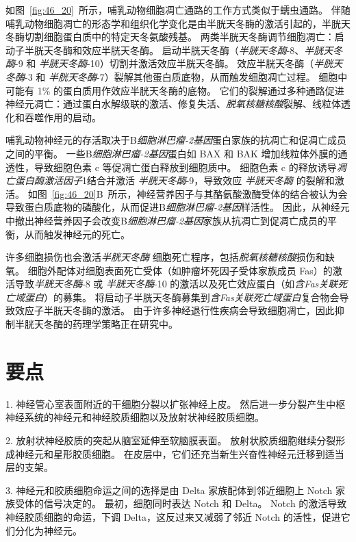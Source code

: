 如图~\ref{fig:46_20}~所示，哺乳动物细胞凋亡通路的工作方式类似于蠕虫通路。
伴随哺乳动物细胞凋亡的形态学和组织化学变化是由半胱天冬酶的激活引起的，半胱天冬酶切割细胞蛋白质中的特定天冬氨酸残基。
两类半胱天冬酶调节细胞凋亡：启动子半胱天冬酶和效应半胱天冬酶。
启动半胱天冬酶（\textit{半胱天冬酶}-8、\textit{半胱天冬酶}-9 和 \textit{半胱天冬酶}-10）切割并激活效应半胱天冬酶。
效应半胱天冬酶（\textit{半胱天冬酶}-3 和 \textit{半胱天冬酶}-7）裂解其他蛋白质底物，从而触发细胞凋亡过程。
细胞中可能有 1\% 的蛋白质用作效应半胱天冬酶的底物。
它们的裂解通过多种通路促进神经元凋亡：通过蛋白水解级联的激活、修复失活、\textit{脱氧核糖核酸}裂解、线粒体透化和吞噬作用的启动。


哺乳动物神经元的存活取决于B\textit{细胞淋巴瘤-}\textit{2基因}蛋白家族的抗凋亡和促凋亡成员之间的平衡。
一些B\textit{细胞淋巴瘤-}\textit{2基因}蛋白如 BAX 和 BAK 增加线粒体外膜的通透性，导致细胞色素 c 等促凋亡蛋白释放到细胞质中。
细胞色素 c 的释放诱导\textit{凋亡蛋白酶激活因子}1结合并激活 \textit{半胱天冬酶}-9，导致效应 \textit{半胱天冬酶} 的裂解和激活。
如图~\ref{fig:46_20}B~所示，神经营养因子与其酪氨酸激酶受体的结合被认为会导致蛋白质底物的磷酸化，从而促进B\textit{细胞淋巴瘤-}\textit{2基因}样活性。
因此，从神经元中撤出神经营养因子会改变B\textit{细胞淋巴瘤-}\textit{2基因}家族从抗凋亡到促凋亡成员的平衡，从而触发神经元的死亡。


许多细胞损伤也会激活\textit{半胱天冬酶} 细胞死亡程序，包括\textit{脱氧核糖核酸}损伤和缺氧。
细胞外配体对细胞表面死亡受体（如肿瘤坏死因子受体家族成员 Fas）的激活导致\textit{半胱天冬酶}-8 或 \textit{半胱天冬酶}-10 的激活以及死亡效应蛋白（如\textit{含Fas关联死亡域蛋白}）的募集。
将启动子半胱天冬酶募集到\textit{含Fas关联死亡域蛋白}复合物会导致效应子半胱天冬酶的激活。
由于许多神经退行性疾病会导致细胞凋亡，因此抑制半胱天冬酶的药理学策略正在研究中。



\section{要点}

1. 神经管心室表面附近的干细胞分裂以扩张神经上皮。
然后进一步分裂产生中枢神经系统的神经元和神经胶质细胞以及放射状神经胶质细胞。


2. 放射状神经胶质的突起从脑室延伸至软脑膜表面。
放射状胶质细胞继续分裂形成神经元和星形胶质细胞。
在皮层中，它们还充当新生兴奋性神经元迁移到适当层的支架。


3. 神经元和胶质细胞命运之间的选择是由 Delta 家族配体到邻近细胞上 Notch 家族受体的信号决定的。
最初，细胞同时表达 Notch 和 Delta。
Notch 的激活导致神经胶质细胞的命运，下调 Delta，这反过来又减弱了邻近 Notch 的活性，促进它们分化为神经元。


